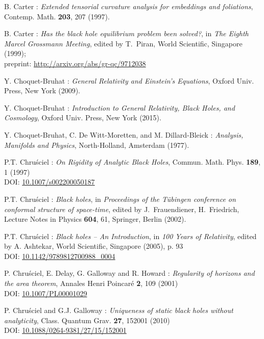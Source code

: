\begin{thebibliography}{123}
B. Carter : {\em Extended tensorial curvature analysis for embeddings
and foliations},
Contemp. Math. {\bf 203}, 207 (1997).

B. Carter : {\em Has the black hole equilibrium problem been solved?},
in {\em The Eighth Marcel Grossmann Meeting}, edited by T.~Piran,
World Scientific, Singapore (1999);\\
preprint: \url{http://arxiv.org/abs/gr-qc/9712038}

Y. Choquet-Bruhat : {\em General Relativity and Einstein's Equations},
Oxford Univ. Press, New York (2009).

Y. Choquet-Bruhat : {\em Introduction to General Relativity, Black Holes, and
Cosmology}, Oxford Univ. Press, New York (2015).

Y. Choquet-Bruhat, C. De Witt-Moretten, and M. Dillard-Bleick :
{\em Analysis, Manifolds and Physics},
North-Holland, Amsterdam (1977).

P.T. Chru\'sciel : {\em On Rigidity of Analytic Black Holes},
Commun. Math. Phys. {\bf 189}, 1 (1997) \\
DOI: \href{http://dx.doi.org/10.1007/s002200050187}{10.1007/s002200050187}

P.T. Chru\'sciel : {\em Black holes},
in {\em Proceedings of the T\"ubingen conference on conformal structure of
space-time}, edited by J.~Frauendiener, H.~Friedrich,
Lecture Notes in Physics {\bf 604}, 61,
Springer, Berlin (2002).

P.T. Chru\'sciel : {\em Black holes -- An Introduction},
in {\em 100 Years of Relativity}, edited by A. Ashtekar,
World Scientific, Singapore (2005), p. 93\\
DOI: \href{http://dx.doi.org/doi:10.1142/9789812700988_0004}{10.1142/9789812700988\_0004}

P. Chru\'sciel, E. Delay, G. Galloway and R. Howard :
{\em Regularity of horizons and the area theorem},
Annales Henri Poincar\'e {\bf 2}, 109 (2001)\\
DOI: \href{http://dx.doi.org/10.1007/PL00001029}{10.1007/PL00001029}

P. Chru\'sciel and G.J. Galloway :
{\em Uniqueness of static black holes without analyticity},
Class. Quantum Grav. {\bf 27}, 152001 (2010)\\
DOI: \href{http://dx.doi.org/10.1088/0264-9381/27/15/152001}{10.1088/0264-9381/27/15/152001}


\end{thebibliography}
